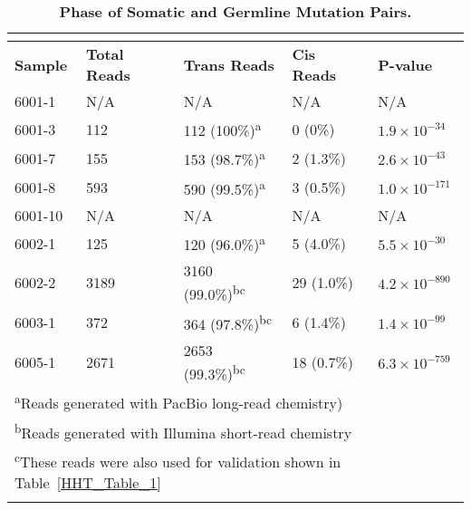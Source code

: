 \begin{table}[]
\footnotesize
\renewcommand{\arraystretch}{1.4} 
\centering
\caption[Phase of Somatic and Germline Mutation Pairs.]{\textbf{Phase of Somatic and Germline Mutation Pairs.}}

\begin{tabularx}{0.75\linewidth}{lllll}
\multicolumn{5}{l}{} \\
\toprule
\textbf{Sample} & \textbf{Total Reads} & \textbf{Trans Reads} & \textbf{Cis Reads} & \textbf{P-value} \\
\midrule
6001-1	& N/A	& N/A						& N/A		& N/A \\\hline
6001-3	& 112	& 112 (100\%)\textsuperscript{a}	& 0 (0\%)		& $1.9\times10^{-34}$ \\\hline
6001-7	& 155	& 153 (98.7\%)\textsuperscript{a}	& 2 (1.3\%)	& $2.6\times10^{-43}$ \\\hline
6001-8	& 593	& 590 (99.5\%)\textsuperscript{a}	& 3 (0.5\%)	& $1.0\times10^{-171}$ \\\hline
6001-10	& N/A	& N/A						& N/A		& N/A \\\hline
6002-1	& 125	& 120 (96.0\%)\textsuperscript{a}	& 5 (4.0\%)	& $5.5\times10^{-30}$ \\\hline
6002-2	& 3189	& 3160 (99.0\%)\textsuperscript{bc}	& 29 (1.0\%)	& $4.2\times10^{-890}$ \\\hline
6003-1	& 372	& 364 (97.8\%)\textsuperscript{bc}	& 6 (1.4\%)	& $1.4\times10^{-99}$ \\\hline
6005-1	& 2671	& 2653 (99.3\%)\textsuperscript{bc}	& 18 (0.7\%)	& $6.3\times10^{-759}$ \\

\bottomrule
\multicolumn{5}{l}{\textsuperscript{a}Reads generated with PacBio long-read chemistry)} \\
\multicolumn{5}{l}{\textsuperscript{b}Reads generated with Illumina short-read chemistry} \\
\multicolumn{5}{l}{\textsuperscript{c}These reads were also used for validation shown in Table~\ref{HHT_Table_1}} \\
\label{HHT_Table_2}
\end{tabularx}

\end{table}



